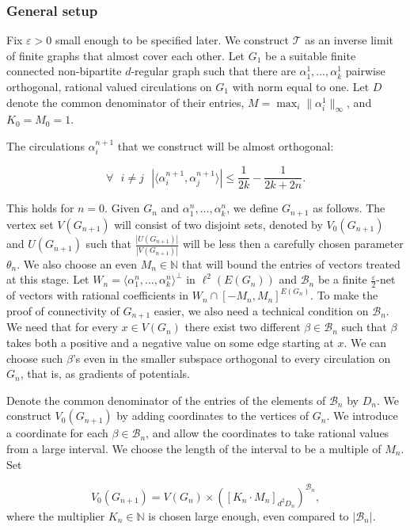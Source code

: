\documentclass[10pt]{article}
\theoremstyle{plain}
\theoremstyle{remark}
\newcommand{\1}{\mathbbm{1}}
\newcommand{\N}{\mathbb{N}}
\newcommand{\mcT}{\mathcal{T}}
\numberwithin{equation}{section}
\begin{document}
\subsubsection{General setup}
Fix $\varepsilon > 0$ small enough to be specified later. We construct $\mcT$ as an inverse limit of finite graphs that almost cover each other. Let $G_1$ be a suitable finite connected non-bipartite $d$-regular graph such that there are $\alpha^1_1, \ldots, \alpha^1_k$ pairwise orthogonal, rational valued circulations on $G_1$ with
norm equal to one. Let $D$ denote the common denominator of their entries, $M = \max_i \|\alpha^1_i\|_{\infty}$, and $K_0=M_0=1$.

The circulations $\alpha_i^{n+1}$ that we construct will be almost orthogonal:

$$\forall \text{ } i \neq j \text{ } |\langle \alpha_i^{n+1}, \alpha_j^{n+1} \rangle | \leq \frac{1}{2k}-\frac{1}{2k+2n}.$$ 

This holds for $n=0$. Given $G_n$ and $\alpha^n_1, \ldots, \alpha^n_k$, we define $G_{n+1}$ as follows. The vertex set $V(G_{n+1})$ will consist of two disjoint sets, denoted by $V_0(G_{n+1})$ and $U(G_{n+1})$ such that $\frac{|U(G_{n+1})|}{|V(G_{n+1})|}$ will be less then a carefully chosen parameter $\theta_n$. We also choose an even $M_n \in \mathbb{N}$ that will bound the entries of vectors treated at this stage. 
Let $W_n=\langle \alpha^n_1, \ldots, \alpha^n_k\rangle^{\perp}$ in $\ell^2(E(G_n))$ and $\mathcal{B}_n$ be a finite $\frac{\varepsilon}{2}$-net of vectors with rational coefficients in $W_n \cap [-M_n, M_n]^{E(G_n)}$. 
To make the proof of connectivity of $G_{n+1}$ easier, we also need a technical condition on $\mathcal{B}_n$. We need that for every $x \in V(G_n)$ there exist two different $\beta \in \mathcal{B}_n$ such that $\beta$ takes both a positive and a negative value on some edge starting at $x$. We can choose such $\beta$'s even in the smaller subspace orthogonal to every circulation on $G_n$, that is, as gradients of potentials.

Denote the common denominator of the entries of the elements of $\mathcal{B}_n$ by $D_n$. We construct $V_0(G_{n+1})$ by adding coordinates to the vertices of $G_n$.  We introduce a coordinate for each $\beta \in \mathcal{B}_n$, and allow the  coordinates to take rational values from a large interval. We choose the length of the interval to be a multiple of $M_n$. Set

\[V_0(G_{n+1}) = V(G_n) \times \left([K_n \cdot M_n]_{d^2D_n}\right)^{\mathcal{B}_n},\] 
where the multiplier $K_n \in \N$ is chosen large enough, even compared to $|\mathcal{B}_n|$.
\end{document}
